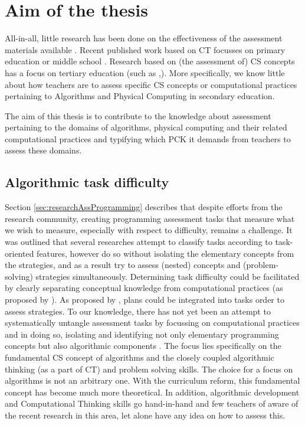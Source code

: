 \section{Aim of the thesis}\label{sec:aim}
All-in-all, little research has been done on the effectiveness of the assessment materials available \cite{Yadav2016}. Recent published work based on CT focusses on primary education or middle school \cite{LyeKoh2014}. Research based on (the assessment of) CS concepts has a focus on tertiary education (such as \cite{McCracken2001},\cite{2010TewGuzdial}). More specifically, we know little about how teachers are to assess specific CS concepts or computational practices pertaining to Algorithms and Physical Computing in secondary education.

The aim of this thesis is to contribute to the knowledge about assessment pertaining to the domains of algorithms, physical computing and their related computational practices and typifying which PCK it demands from teachers to assess these domains.

\subsection*{Algorithmic task difficulty}
Section \ref{sec:researchAssProgramming} describes that despite efforts from the research community, creating programming assessment tasks that measure what we wish to measure, especially with respect to difficulty, remains a challenge. It was outlined that several researches attempt to classify tasks according to task-oriented features, however do so without isolating the elementary concepts from the strategies, and as a result try to assess (nested) concepts and (problem-solving) strategies simultaneously. Determining task difficulty could be facilitated by clearly separating conceptual knowledge from computational practices (as proposed by \citeauthor{BrennanResnick2012}). As proposed by \citeauthor{deRaadt2009teachingPlans}, plans could be integrated into tasks order to assess strategies. To our knowledge, there has not yet been an attempt to systematically untangle assessment tasks by focussing on computational practices and in doing so, isolating and identifying not only elementary programming concepts but also algorithmic components \cite{deRaadt2008}. The focus lies specifically on the fundamental CS concept of algorithms and the closely coupled algorithmic thinking (as a part of CT) and problem solving skills. The choice for a focus on algorithms is not an arbitrary one. With the curriculum reform, this fundamental concept has become much more theoretical. In addition, algorithmic development and Computational Thinking skills go hand-in-hand and few teachers of aware of the recent research in this area, let alone have any idea on how to assess this.

